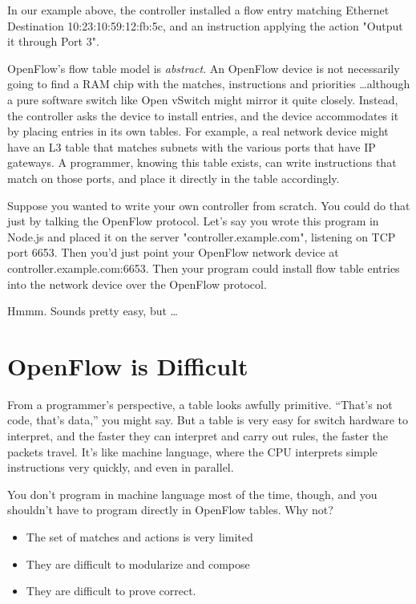 In our example above, the controller installed a flow entry matching Ethernet Destination 10:23:10:59:12:fb:5c, 
and an instruction applying the action "Output it through Port 3".

OpenFlow's flow table model is \textit{abstract}.
An OpenFlow device is not necessarily going to find a RAM chip with the matches, 
instructions and priorities \ldots although a pure software switch like Open vSwitch might mirror it quite closely.
Instead, the controller asks the device to install entries, and the device accommodates it by placing entries in its
own tables.
For example, a real network device might have an L3 table that matches subnets with the various ports that have
IP gateways.
A programmer, knowing this table exists, can write instructions that match on those ports, and place it directly in the
table accordingly.

Suppose you wanted to write your own controller from scratch.  
You could do that just by talking the OpenFlow protocol.
Let's say you wrote this program in Node.js and placed it on the server "controller.example.com", 
listening on TCP port 6653.
Then you'd just point your OpenFlow network device at controller.example.com:6653.
Then your program could install flow table entries into the network device over the OpenFlow protocol.

Hmmm.
Sounds pretty easy, but \ldots

\section{OpenFlow is Difficult}

From a programmer's perspective, a table looks awfully primitive.  
``That's not code, that's data,'' you might say.
But a table is very easy for switch hardware to interpret, and the faster they can interpret and carry 
out rules, the faster the packets travel.  
It's like machine language, where the CPU interprets simple instructions very quickly, and even in parallel.

You don't program in machine language most of the time, though, and you shouldn't have to program directly in
OpenFlow tables.
Why not?  

\begin{itemize}
\item The set of matches and actions is very limited
\item They are difficult to modularize and compose
\item They are difficult to prove correct.  
\end{itemize}

